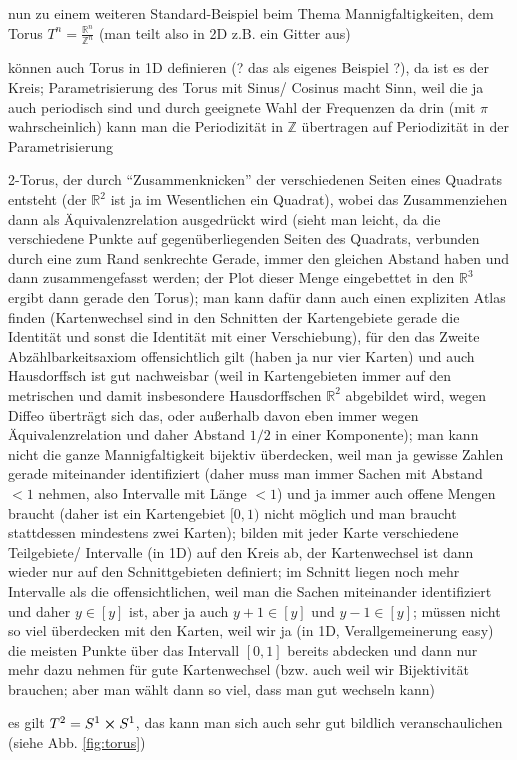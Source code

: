 \documentclass[../H_Analysis_main.tex]{subfiles}
\begin{document}
\begin{bsp}[Torus]
nun zu einem weiteren Standard-Beispiel beim Thema Mannigfaltigkeiten, dem Torus $T^n = \frac{\mathbb{R}^n}{\mathbb{Z}^n}$ (man teilt also in 2D z.B. ein Gitter aus)

können auch Torus in 1D definieren (? das als eigenes Beispiel ?), da ist es der Kreis; Parametrisierung des Torus mit Sinus/ Cosinus macht Sinn, weil die ja auch periodisch sind und durch geeignete Wahl der Frequenzen da drin (mit $\pi$ wahrscheinlich) kann man die Periodizität in $\mathbb{Z}$ übertragen auf Periodizität in der Parametrisierung

2-Torus, der durch \enquote{Zusammenknicken} der verschiedenen Seiten eines Quadrats entsteht (der $\mathbb{R}^2$ ist ja im Wesentlichen ein Quadrat), wobei das Zusammenziehen dann als Äquivalenzrelation ausgedrückt wird (sieht man leicht, da die verschiedene Punkte auf gegenüberliegenden Seiten des Quadrats, verbunden durch eine zum Rand senkrechte Gerade, immer den gleichen Abstand haben und dann zusammengefasst werden; der Plot dieser Menge eingebettet in den $\mathbb{R}^3$ ergibt dann gerade den Torus); man kann dafür dann auch einen expliziten Atlas finden (Kartenwechsel sind in den Schnitten der Kartengebiete gerade die Identität und sonst die Identität mit einer Verschiebung), für den das Zweite Abzählbarkeitsaxiom offensichtlich gilt (haben ja nur vier Karten) und auch Hausdorffsch ist gut nachweisbar (weil in Kartengebieten immer auf den metrischen und damit insbesondere Hausdorffschen $\mathbb{R}^2$ abgebildet wird, wegen Diffeo überträgt sich das, oder außerhalb davon eben immer wegen Äquivalenzrelation und daher Abstand $1/2$ in einer Komponente); man kann nicht die ganze Mannigfaltigkeit bijektiv überdecken, weil man ja gewisse Zahlen gerade miteinander identifiziert (daher muss man immer Sachen mit Abstand $< 1$ nehmen, also Intervalle mit Länge $< 1$) und ja immer auch offene Mengen braucht (daher ist ein Kartengebiet $[0, 1)$ nicht möglich und man braucht stattdessen mindestens zwei Karten); bilden mit jeder Karte verschiedene Teilgebiete/ Intervalle (in 1D) auf den Kreis ab, der Kartenwechsel ist dann wieder nur auf den Schnittgebieten definiert; im Schnitt liegen noch mehr Intervalle als die offensichtlichen, weil man die Sachen miteinander identifiziert und daher $y \in [y]$ ist, aber ja auch $y+1 \in [y]$ und $y-1 \in [y]$; müssen nicht so viel überdecken mit den Karten, weil wir ja (in 1D, Verallgemeinerung easy) die meisten Punkte über das Intervall $[0, 1]$ bereits abdecken und dann nur mehr dazu nehmen für gute Kartenwechsel (bzw. auch weil wir Bijektivität brauchen; aber man wählt dann so viel, dass man gut wechseln kann)

es gilt $T^2 = S^1 \cross S^1$, das kann man sich auch sehr gut bildlich veranschaulichen (siehe Abb. \ref{fig:torus})
\end{bsp}
\end{document}
